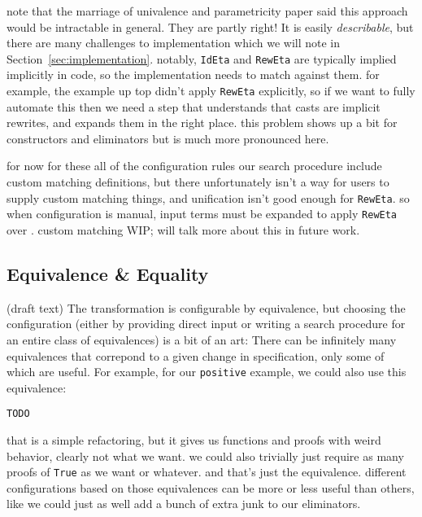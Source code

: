 note that the marriage of univalence and parametricity paper said this approach would be intractable in general.
They are partly right!
It is easily \textit{describable}, but there are many challenges to implementation which we will note in Section~\ref{sec:implementation}.
notably, \lstinline{IdEta} and \lstinline{RewEta} are typically implied implicitly in code, so the implementation needs to match
against them.
for example, the example up top didn't apply \lstinline{RewEta} explicitly, so if we want to fully automate this then
we need a step that understands that casts are implicit rewrites, and expands them in the right place.
this problem shows up a bit for constructors and eliminators but is much more pronounced here.

for now for these all of the configuration rules our search procedure include custom matching definitions,
but there unfortunately isn't a way for users to supply custom matching things,
and unification isn't good enough for \lstinline{RewEta}.
so when configuration is manual, input terms must be expanded to apply \lstinline{RewEta} over \A.
custom matching WIP; will talk more about this in future work.

\subsection{Equivalence \& Equality}
\label{sec:art}

(draft text) The transformation is configurable by equivalence, but choosing the configuration (either by providing direct input or writing a 
search procedure for an entire class of equivalences) is a bit of an art: There can be infinitely many equivalences that correpond to a 
given change in specification, only some of which are useful.
For example, for our \lstinline{positive} example, we could also use this equivalence:

\begin{lstlisting}
TODO
\end{lstlisting}
that is a simple refactoring, but it gives us functions and proofs with weird behavior, clearly not what we want.
we could also trivially just require as many proofs of \lstinline{True} as we want or whatever.
and that's just the equivalence.
different configurations based on those equivalences
can be more or less useful than others, %
like we could just as well add a bunch of extra junk to our eliminators.

